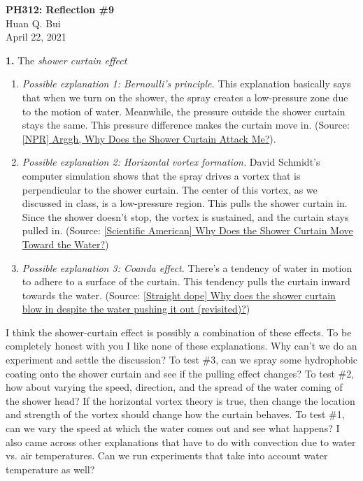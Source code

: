 \documentclass[11pt]{article}
\begin{document}
\begin{center}
{\large \bf PH312: Reflection \#9}\\
{ Huan Q. Bui}\\
April 22, 2021
\end{center}


\noindent \textbf{1.} The \textit{shower curtain effect}

\begin{enumerate}
	\item \textit{Possible explanation 1: Bernoulli's principle.} This explanation basically says that when we turn on the shower, the spray creates a low-pressure zone due to the motion of water. Meanwhile, the pressure outside the shower curtain stays the same. This pressure difference makes the curtain move in. (Source: \href{https://www.npr.org/templates/story/story.php?storyId=6430581}{[NPR] Arggh, Why Does the Shower Curtain Attack Me?}). 
	
	\item \textit{Possible explanation 2: Horizontal vortex formation.} David Schmidt's computer simulation shows that the spray drives a vortex that is perpendicular to the shower curtain. The center of this vortex, as we discussed in class, is a low-pressure region. This pulls the shower curtain in. Since the shower doesn't stop, the vortex is sustained, and the curtain stays pulled in. (Source: \href{https://www.scientificamerican.com/article/why-does-the-shower-curta/}{[Scientific American] Why Does the Shower Curtain Move Toward the Water?})
	
	\item \textit{Possible explanation 3: Coanda effect.} There's a tendency of water in motion to adhere to a surface of the curtain.  This tendency pulls the curtain inward towards the water. (Source: \href{https://www.straightdope.com/21342516/why-does-the-shower-curtain-blow-in-despite-the-water-pushing-it-out-revisited}{[Straight dope] Why does the shower curtain blow in despite the water pushing it out (revisited)?}) 
\end{enumerate}

I think the shower-curtain effect is possibly a combination of these effects. To be completely honest with you I like none of these explanations. Why can't we do an experiment and settle the discussion? To test \#3, can we spray some hydrophobic coating onto the shower curtain and see if the pulling effect changes? To test \#2, how about varying the speed, direction, and the spread of the water coming of the shower head? If the horizontal vortex theory is true, then change the location and strength of the vortex should change how the curtain behaves. To test \#1, can we vary the speed at which the water comes out and see what happens? I also came across other explanations that have to do with convection due to water vs. air temperatures. Can we run experiments that take into account water temperature as well? \\
\end{document}
